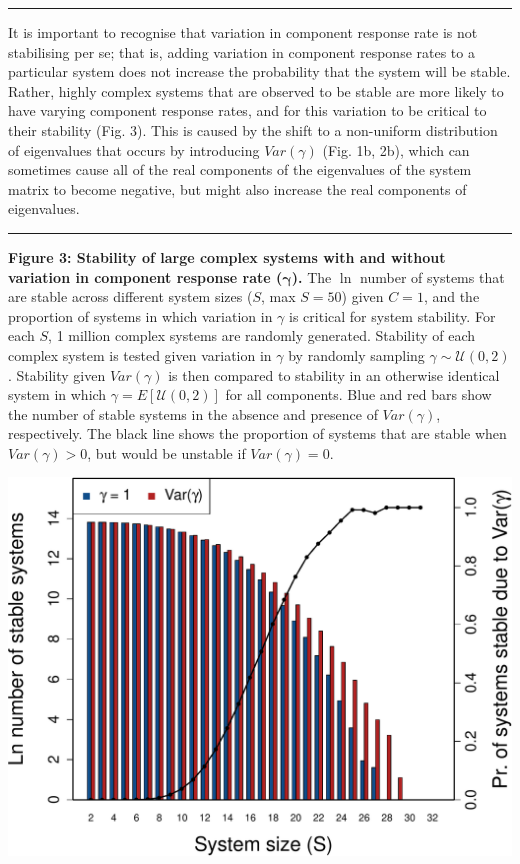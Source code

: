 \documentclass[]{article}
\begin{document}
\begin{center}\rule{0.5\linewidth}{\linethickness}\end{center}

It is important to recognise that variation in component response rate
is not stabilising per se; that is, adding variation in component
response rates to a particular system does not increase the probability
that the system will be stable. Rather, highly complex systems that are
observed to be stable are more likely to have varying component response
rates, and for this variation to be critical to their stability (Fig.
3). This is caused by the shift to a non-uniform distribution of
eigenvalues that occurs by introducing \(Var(\gamma)\) (Fig. 1b, 2b),
which can sometimes cause all of the real components of the eigenvalues
of the system matrix to become negative, but might also increase the
real components of eigenvalues.

\begin{center}\rule{0.5\linewidth}{\linethickness}\end{center}

\textbf{Figure 3: Stability of large complex systems with and without
variation in component response rate (\(\boldsymbol{\gamma}\)).} The
\(\ln\) number of systems that are stable across different system sizes
(\(S\), max \(S=50\)) given \(C = 1\), and the proportion of systems in
which variation in \(\gamma\) is critical for system stability. For each
\(S\), 1 million complex systems are randomly generated. Stability of
each complex system is tested given variation in \(\gamma\) by randomly
sampling \(\gamma \sim \mathcal{U}(0, 2)\). Stability given
\(Var(\gamma)\) is then compared to stability in an otherwise identical
system in which \(\gamma = E[\mathcal{U}(0, 2)]\) for all components.
Blue and red bars show the number of stable systems in the absence and
presence of \(Var(\gamma)\), respectively. The black line shows the
proportion of systems that are stable when \(Var(\gamma) > 0\), but
would be unstable if \(Var(\gamma) = 0\).

\includegraphics{unnamed-chunk-15-1.pdf}
\end{document}

